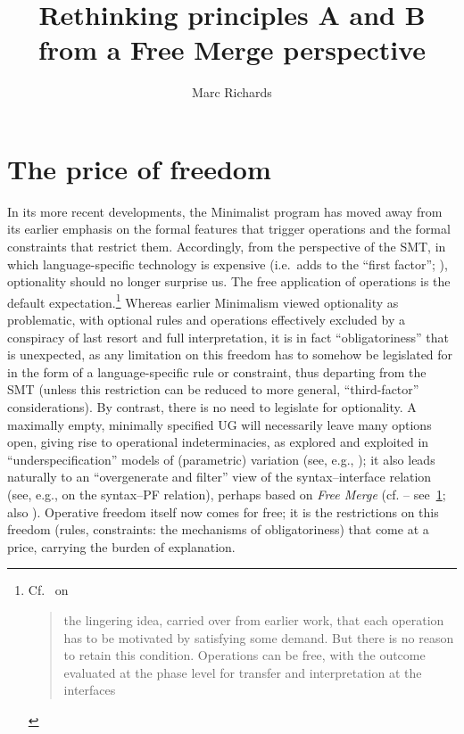 \documentclass[output=paper]{langsci/langscibook}
\author{Marc Richards\affiliation{Queen's University Belfast}}
\title{Rethinking principles A and B from a Free Merge perspective}
\begin{document}
\glsresetall

\section{The price of freedom}\label{sec:22.1}

In its more recent developments, the Minimalist program has moved away from its
earlier emphasis on the formal features that trigger operations and the formal
constraints that restrict them. Accordingly, from the perspective of the
\gls{SMT}, in which language-specific technology is expensive (i.e.\ adds to
the \enquote{first factor}; \citealt{Chomsky2005}), optionality should no
longer surprise us. The free application of operations is the default
expectation.\footnote{Cf.\ \citet[10--11]{Chomsky2015} on \blockquote{the
        lingering idea, carried over from earlier work, that each operation has
        to be motivated by satisfying some demand.  But there is no reason to
        retain this condition.  Operations can be free, with the outcome
evaluated at the phase level for transfer and interpretation at the
interfaces}.\label{fn:22.1}} Whereas earlier Minimalism \citep{Chomsky1995}
viewed optionality as problematic, with optional rules and operations
effectively excluded by a conspiracy of last resort and full interpretation, it
is in fact \enquote{obligatoriness} that is unexpected, as any limitation on
this freedom has to somehow be legislated for in the form of a
language-specific rule or constraint, thus departing from the \gls{SMT} (unless
this restriction can be reduced to more general, \enquote{third-factor}
considerations). By contrast, there is no need to legislate for optionality. A
maximally empty, minimally specified \gls{UG} will necessarily
leave many options open, giving rise to operational indeterminacies, as
explored and exploited in \enquote{underspecification} models of (parametric)
variation (see, e.g.,
\citealt{Uriagereka1994,BibRich2006,BerCho2011,Richards2008b,Kandybowicz2009,Boeckx2011b,RobHol2010});
it also leads naturally to an \enquote{overgenerate and filter} view of the
syntax--interface relation (see, e.g., \citealt{Richards2004,Richards2007b} on the
syntax--\gls{PF} relation), perhaps based on \emph{Free Merge} (cf.
\citealt{Chomsky2007,Chomsky2008,Chomsky2013,Chomsky2015} --
see~\cref{fn:22.1}; also \citealt{Boeckx2011b}). Operative freedom itself now
comes for free; it is the restrictions on this freedom (rules, constraints: the
mechanisms of obligatoriness) that come at a price, carrying the burden of
explanation.
\end{document}
